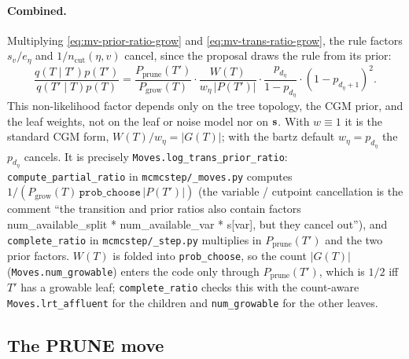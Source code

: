 \paragraph{Combined.}
Multiplying \eqref{eq:mv-prior-ratio-grow} and
\eqref{eq:mv-trans-ratio-grow}, the rule factors $s_v / e_\eta$ and
$1/n_{\mathrm{cut}}(\eta, v)$ cancel, since the proposal draws the rule from
its prior:
\begin{equation}
	\label{eq:mv-nonlk-grow}
	\boxed{
		\frac{q(T \mid T') p(T')}{q(T' \mid T) p(T)}
		= \frac{P_{\mathrm{prune}}(T')}{P_{\mathrm{grow}}(T)} \cdot
		\frac{W(T)}{w_\eta\,|P(T')|} \cdot
		\frac{p_{d_\eta}}{1 - p_{d_\eta}} \cdot
		(1 - p_{d_\eta+1})^{2}.
	}
\end{equation}
This non-likelihood factor depends only on the tree topology, the CGM prior,
and the leaf weights, not on the leaf or noise model nor on $\mathbf{s}$. With
$w \equiv 1$ it is the standard CGM form, $W(T) / w_\eta = |G(T)|$; with the
bartz default $w_\eta = p_{d_\eta}$ the $p_{d_\eta}$ cancels. It is precisely
\texttt{Moves.log\_trans\_prior\_ratio}: \texttt{compute\_partial\_ratio} in
\texttt{mcmcstep/\_moves.py} computes
$1 / (P_{\mathrm{grow}}(T)\,\texttt{prob\_choose}\,|P(T')|)$ (the variable /
cutpoint cancellation is the comment ``the transition and prior ratios also
contain factors num\_available\_split * num\_available\_var * s[var], but
they cancel out''), and \texttt{complete\_ratio} in
\texttt{mcmcstep/\_step.py} multiplies in $P_{\mathrm{prune}}(T')$ and the
two prior factors. $W(T)$ is folded into \texttt{prob\_choose}, so the
count $|G(T)|$ (\texttt{Moves.num\_growable}) enters the code only through
$P_{\mathrm{prune}}(T')$, which is $1/2$ iff $T'$ has a growable leaf;
\texttt{complete\_ratio} checks this with the count-aware
\texttt{Moves.lrt\_affluent} for the children and \texttt{num\_growable}
for the other leaves.

\subsection{The PRUNE move}
\label{sec:mv-prune}

